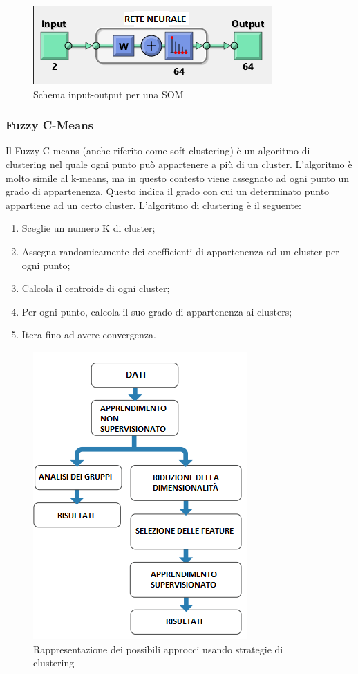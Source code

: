 \begin{figure}[h!]
	\centering
	\includegraphics[scale=0.50]{images/example_som.png}
	\caption{Schema input-output per una SOM}
\end{figure}
\subsubsection{Fuzzy C-Means}
Il Fuzzy C-means (anche riferito come soft clustering) è un algoritmo di clustering nel quale ogni punto può appartenere a più di un cluster. L'algoritmo è molto simile al k-means, ma in questo contesto viene assegnato ad ogni punto un grado di appartenenza. Questo indica il grado con cui un determinato punto appartiene ad un certo cluster. L'algoritmo di clustering è il seguente:
\begin{enumerate}
	\item Sceglie un numero K di cluster;
	\item Assegna randomicamente dei coefficienti di appartenenza ad un cluster per ogni punto;
	\item Calcola il centroide di ogni cluster;
	\item Per ogni punto, calcola il suo grado di appartenenza ai clusters;
	\item Itera fino ad avere convergenza.
\end{enumerate}

\begin{figure}[]
	\centering
	\includegraphics[scale=0.8]{images/Approcci_Clustering.png}
	\caption{Rappresentazione dei possibili approcci usando strategie di clustering}
\end{figure}
